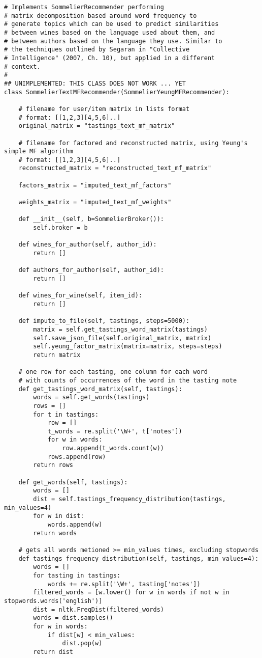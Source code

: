 \begin{verbatim}
# Implements SommelierRecommender performing
# matrix decomposition based around word frequency to
# generate topics which can be used to predict similarities
# between wines based on the language used about them, and
# between authors based on the language they use. Similar to
# the techniques outlined by Segaran in "Collective 
# Intelligence" (2007, Ch. 10), but applied in a different
# context.
#
## UNIMPLEMENTED: THIS CLASS DOES NOT WORK ... YET
class SommelierTextMFRecommender(SommelierYeungMFRecommender):

    # filename for user/item matrix in lists format
    # format: [[1,2,3][4,5,6]..]
    original_matrix = "tastings_text_mf_matrix"

    # filename for factored and reconstructed matrix, using Yeung's simple MF algorithm
    # format: [[1,2,3][4,5,6]..]
    reconstructed_matrix = "reconstructed_text_mf_matrix"

    factors_matrix = "imputed_text_mf_factors"

    weights_matrix = "imputed_text_mf_weights"   

    def __init__(self, b=SommelierBroker()):
        self.broker = b

    def wines_for_author(self, author_id):
        return []

    def authors_for_author(self, author_id):
        return []

    def wines_for_wine(self, item_id):
        return []

    def impute_to_file(self, tastings, steps=5000):
        matrix = self.get_tastings_word_matrix(tastings)
        self.save_json_file(self.original_matrix, matrix)
        self.yeung_factor_matrix(matrix=matrix, steps=steps)
        return matrix

    # one row for each tasting, one column for each word
    # with counts of occurrences of the word in the tasting note
    def get_tastings_word_matrix(self, tastings):
        words = self.get_words(tastings)
        rows = []
        for t in tastings:
            row = []
            t_words = re.split('\W+', t['notes'])
            for w in words:
                row.append(t_words.count(w))
            rows.append(row)
        return rows

    def get_words(self, tastings):
        words = []
        dist = self.tastings_frequency_distribution(tastings, min_values=4)
        for w in dist:
            words.append(w)
        return words

    # gets all words metioned >= min_values times, excluding stopwords
    def tastings_frequency_distribution(self, tastings, min_values=4):
        words = []
        for tasting in tastings:
            words += re.split('\W+', tasting['notes'])
        filtered_words = [w.lower() for w in words if not w in stopwords.words('english')]
        dist = nltk.FreqDist(filtered_words)
        words = dist.samples()
        for w in words:
            if dist[w] < min_values:
                dist.pop(w)
        return dist
\end{verbatim}

